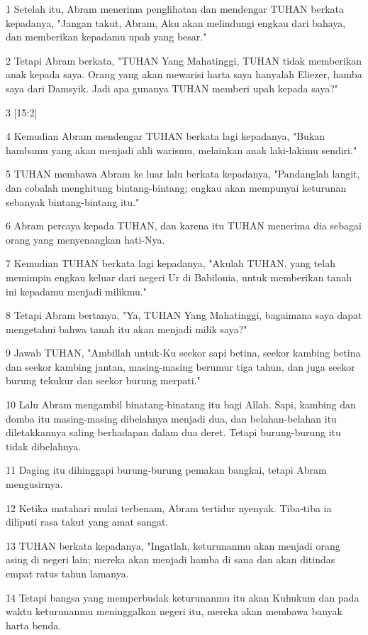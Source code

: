\par 1 Setelah itu, Abram menerima penglihatan dan mendengar TUHAN berkata kepadanya, "Jangan takut, Abram, Aku akan melindungi engkau dari bahaya, dan memberikan kepadamu upah yang besar."
\par 2 Tetapi Abram berkata, "TUHAN Yang Mahatinggi, TUHAN tidak memberikan anak kepada saya. Orang yang akan mewarisi harta saya hanyalah Eliezer, hamba saya dari Damsyik. Jadi apa gunanya TUHAN memberi upah kepada saya?"
\par 3 [15:2]
\par 4 Kemudian Abram mendengar TUHAN berkata lagi kepadanya, "Bukan hambamu yang akan menjadi ahli warismu, melainkan anak laki-lakimu sendiri."
\par 5 TUHAN membawa Abram ke luar lalu berkata kepadanya, "Pandanglah langit, dan cobalah menghitung bintang-bintang; engkau akan mempunyai keturunan sebanyak bintang-bintang itu."
\par 6 Abram percaya kepada TUHAN, dan karena itu TUHAN menerima dia sebagai orang yang menyenangkan hati-Nya.
\par 7 Kemudian TUHAN berkata lagi kepadanya, "Akulah TUHAN, yang telah memimpin engkau keluar dari negeri Ur di Babilonia, untuk memberikan tanah ini kepadamu menjadi milikmu."
\par 8 Tetapi Abram bertanya, "Ya, TUHAN Yang Mahatinggi, bagaimana saya dapat mengetahui bahwa tanah itu akan menjadi milik saya?"
\par 9 Jawab TUHAN, "Ambillah untuk-Ku seekor sapi betina, seekor kambing betina dan seekor kambing jantan, masing-masing berumur tiga tahun, dan juga seekor burung tekukur dan seekor burung merpati."
\par 10 Lalu Abram mengambil binatang-binatang itu bagi Allah. Sapi, kambing dan domba itu masing-masing dibelahnya menjadi dua, dan belahan-belahan itu diletakkannya saling berhadapan dalam dua deret. Tetapi burung-burung itu tidak dibelahnya.
\par 11 Daging itu dihinggapi burung-burung pemakan bangkai, tetapi Abram mengusirnya.
\par 12 Ketika matahari mulai terbenam, Abram tertidur nyenyak. Tiba-tiba ia diliputi rasa takut yang amat sangat.
\par 13 TUHAN berkata kepadanya, "Ingatlah, keturunanmu akan menjadi orang asing di negeri lain; mereka akan menjadi hamba di sana dan akan ditindas empat ratus tahun lamanya.
\par 14 Tetapi bangsa yang memperbudak keturunanmu itu akan Kuhukum dan pada waktu keturunanmu meninggalkan negeri itu, mereka akan membawa banyak harta benda.
